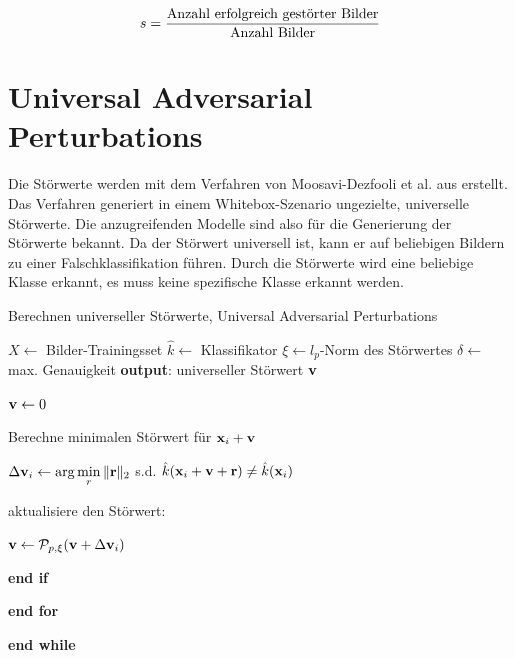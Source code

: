 \documentclass{FFHS_Thesis_Additions/ffhsthesis}
\begin{document}
\[
s = \frac{\textnormal{Anzahl erfolgreich gestörter Bilder}}
			{\textnormal{Anzahl Bilder}} 
\]

\chapter{Universal Adversarial Perturbations}
\label{c_uap}

Die Störwerte werden mit dem Verfahren von Moosavi-Dezfooli et al. aus \cite{moosavi-dezfooli_universal_2017-1} erstellt. 
Das Verfahren generiert in einem Whitebox-Szenario ungezielte, universelle Störwerte.
Die anzugreifenden Modelle sind also für die Generierung der Störwerte bekannt. Da der Störwert universell ist, kann er auf beliebigen Bildern zu einer Falschklassifikation führen. Durch die Störwerte wird eine beliebige Klasse erkannt, es muss keine spezifische Klasse erkannt werden.


\begin{algorithm}
\caption{Berechnen universeller Störwerte, Universal Adversarial Perturbations \cite{moosavi-dezfooli_universal_2017-1}}
\label{alg_univ_stoerwert}
\begin{algorithmic}[1]

\State $X \gets$ Bilder-Trainingsset
\State $\hat{k} \gets$ Klassifikator
\State $\xi \gets l_p$-Norm des Störwertes
\State $\delta \gets$ max. Genauigkeit
\State \textbf{output}: universeller Störwert $\bold{v}$

\State $\bold{v} \gets 0$




\State Berechne minimalen Störwert für $\bold{x}_i + \bold{v}$

\State $\displaystyle \Delta \bold{v}_i \gets \arg \min_{r} \Vert \bold{r} \Vert_2$ s.d. $\hat{k}(\bold{x}_i + \bold{v} + \bold{r}) \neq \hat{k}(\bold{x}_i) $

\State aktualisiere den Störwert: \

\State $\bold{v} \gets \mathcal{P}_{p,\xi}(\bold{v} + \Delta \bold{v}_i)$

\EndIf
\State \textbf{end if}

\EndFor
\State \textbf{end for}

\EndWhile
\State \textbf{end while}

\end{algorithmic}
\end{algorithm}
\end{document}
